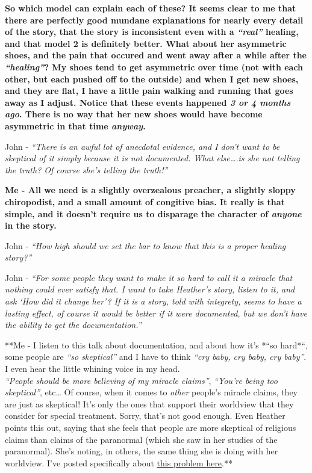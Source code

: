 \textbf{So which model can explain each of these? It seems clear to me
that there are perfectly good mundane explanations for nearly every
detail of the story, that the story is inconsistent even with a
\emph{``real''} healing, and that model 2 is definitely better. What
about her asymmetric shoes, and the pain that occured and went away
after a while after the \emph{``healing''}? My shoes tend to get
asymmetric over time (not with each other, but each pushed off to the
outside) and when I get new shoes, and they are flat, I have a little
pain walking and running that goes away as I adjust. Notice that these
events happened \emph{3 or 4 months ago}. There is no way that her new
shoes would have become asymmetric in that time \emph{anyway}.\\}

John - \emph{``There is an awful lot of anecdotal evidence, and I don't
want to be skeptical of it simply because it is not documented. What
else\ldots{}.is she not telling the truth? Of course she's telling the
truth!''}

\textbf{Me - All we need is a slightly overzealous preacher, a slightly
sloppy chiropodist, and a small amount of congitive bias. It really is
that simple, and it doesn't require us to disparage the character of
\emph{anyone} in the story.}

John - \emph{``How high should we set the bar to know that this is a
proper healing story?''}

John - \emph{``For some people they want to make it so hard to call it a
miracle that nothing could ever satisfy that. I want to take Heather's
story, listen to it, and ask `How did it change her'? If it is a story,
told with integrety, seems to have a lasting effect, of course it would
be better if it were documented, but we don't have the ability to get
the documentation.''}

**Me - I listen to this talk about documentation, and about how it's
*``so hard*``, some people are \emph{``so skeptical''} and I have to
think \emph{``cry baby, cry baby, cry baby''}. I even hear the little
whining voice in my head.\\\emph{``People should be more believing of my
miracle claims''}, \emph{``You're being too skeptical''}, etc\ldots{} Of
course, when it comes to \emph{other} people's miracle claims, they are
just as skeptical! It's only the ones that support their worldview that
they consider for special treatment. Sorry, that's not good enough. Even
Heather points this out, saying that she feels that people are more
skeptical of religious claims than claims of the paranormal (which she
saw in her studies of the paranormal). She's noting, in others, the same
thing she is doing with her worldview. I've posted specifically about
\href{https://brianblais.wordpress.com/2012/09/25/naturalistic-bias-presupposing-naturalism/}{this
problem here}.**

